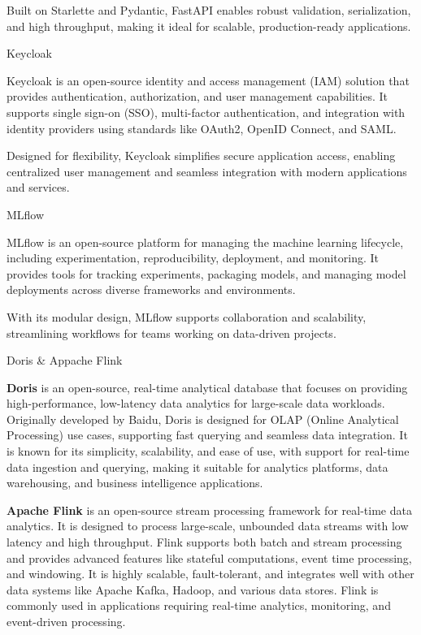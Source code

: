 Built on Starlette and Pydantic, FastAPI enables robust validation, serialization, and high throughput, making it ideal for scalable, production-ready applications.

\secc Keycloak

Keycloak is an open-source identity and access management (IAM) solution that provides authentication, authorization, and user management capabilities. It supports single sign-on (SSO), multi-factor authentication, and integration with identity providers using standards like OAuth2, OpenID Connect, and SAML.

Designed for flexibility, Keycloak simplifies secure application access, enabling centralized user management and seamless integration with modern applications and services.

\secc MLflow

MLflow is an open-source platform for managing the machine learning lifecycle, including experimentation, reproducibility, deployment, and monitoring. It provides tools for tracking experiments, packaging models, and managing model deployments across diverse frameworks and environments.

With its modular design, MLflow supports collaboration and scalability, streamlining workflows for teams working on data-driven projects.

\sec Doris \& Appache Flink

{\bf Doris} is an open-source, real-time analytical database that focuses on providing high-performance, low-latency data analytics for large-scale data workloads. Originally developed by Baidu, Doris is designed for OLAP (Online Analytical Processing) use cases, supporting fast querying and seamless data integration. It is known for its simplicity, scalability, and ease of use, with support for real-time data ingestion and querying, making it suitable for analytics platforms, data warehousing, and business intelligence applications.

{\bf Apache Flink} is an open-source stream processing framework for real-time data analytics. It is designed to process large-scale, unbounded data streams with low latency and high throughput. Flink supports both batch and stream processing and provides advanced features like stateful computations, event time processing, and windowing. It is highly scalable, fault-tolerant, and integrates well with other data systems like Apache Kafka, Hadoop, and various data stores. Flink is commonly used in applications requiring real-time analytics, monitoring, and event-driven processing.

